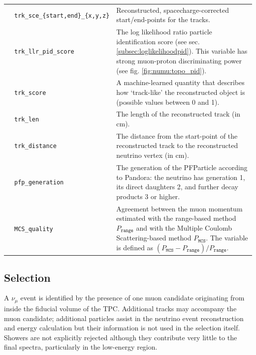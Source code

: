 \begin{table}[H]
\begin{tabular}{ m{} | m{} | m{}  }
\multicolumn{1}{l|}{} & \texttt{trk\_sce\_\{start,end\}\_\{x,y,z\}} &  Reconstructed, spacecharge-corrected start/end-points for the tracks.\\  \cline{2-3}
\multicolumn{1}{l|}{} & \texttt{trk\_llr\_pid\_score} &  The log likelihood ratio particle identification score (see sec. \ref{subsec:loglikelihoodpid}). This variable has strong muon-proton discriminating power (see fig. \ref{fig:numu:topo_pid}).\\  \cline{2-3}
\multicolumn{1}{l|}{} & \texttt{trk\_score} & A machine-learned quantity that describes how `track-like' the reconstructed object is (possible values between 0 and 1). \\  \cline{2-3}
\parbox[t]{2mm}{} & \texttt{trk\_len} & The length of the reconstructed track (in cm). \\  
 & \texttt{trk\_distance} & The distance from the start-point of the reconstructed track to the reconstructed neutrino vertex (in cm). \\  
 & \texttt{pfp\_generation} &  The generation of the PFParticle according to Pandora: the neutrino has generation 1, its direct daughters 2, and further decay products 3 or higher.\\  
 & \texttt{MCS\_quality} &  Agreement between the muon momentum estimated with the range-based method $P_\texttt{range}$ and with the Multiple Coulomb Scattering-based method $P_\texttt{MCS}$. The variable is defined as $(P_\texttt{MCS}-P_\texttt{range})/P_\texttt{range}$.\\  
\hline

\end{tabular}
\label{tab:numuvariableSummary}
\end{table}

\subsection{Selection}
\label{sssec:NuMUCCsel:constr:selectionandsignal}

\par A $\nu_{\mu}$ event is identified by the presence of one muon candidate originating from inside the fiducial volume of the TPC. Additional tracks may accompany the muon candidate; additional particles assist in the neutrino event reconstruction and energy calculation but their information is not used in the selection itself. Showers are not explicitly rejected although they contribute very little to the final spectra, particularly in the low-energy region. 

